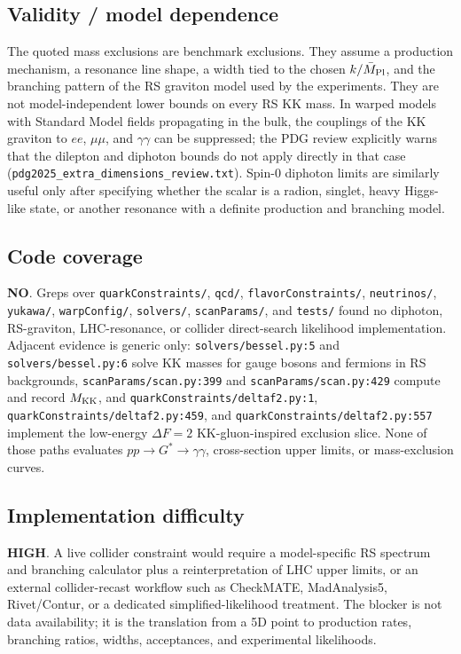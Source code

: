 \subsection*{Validity / model dependence}
The quoted mass exclusions are benchmark exclusions.  They assume a production
mechanism, a resonance line shape, a width tied to the chosen
\(k/\bar M_{\rm Pl}\), and the branching pattern of the RS graviton model used
by the experiments.  They are not model-independent lower bounds on every RS
KK mass.  In warped models with Standard Model fields propagating in the bulk,
the couplings of the KK graviton to \(ee\), \(\mu\mu\), and \(\gamma\gamma\)
can be suppressed; the PDG review explicitly warns that the dilepton and
diphoton bounds do not apply directly in that case
(\texttt{pdg2025\_extra\_dimensions\_review.txt}).  Spin-0 diphoton limits
are similarly useful only after specifying whether the scalar is a radion,
singlet, heavy Higgs-like state, or another resonance with a definite
production and branching model.

\subsection*{Code coverage}
\textbf{NO}.  Greps over \texttt{quarkConstraints/}, \texttt{qcd/},
\texttt{flavorConstraints/}, \texttt{neutrinos/}, \texttt{yukawa/},
\texttt{warpConfig/}, \texttt{solvers/}, \texttt{scanParams/}, and
\texttt{tests/} found no diphoton, RS-graviton, LHC-resonance, or collider
direct-search likelihood implementation.  Adjacent evidence is generic only:
\texttt{solvers/bessel.py:5} and \texttt{solvers/bessel.py:6} solve KK masses
for gauge bosons and fermions in RS backgrounds,
\texttt{scanParams/scan.py:399} and \texttt{scanParams/scan.py:429} compute
and record \(M_{\rm KK}\), and \texttt{quarkConstraints/deltaf2.py:1},
\texttt{quarkConstraints/deltaf2.py:459}, and
\texttt{quarkConstraints/deltaf2.py:557} implement the low-energy
\(\Delta F=2\) KK-gluon-inspired exclusion slice.  None of those
paths evaluates \(pp\to G^*\to\gamma\gamma\), cross-section upper limits, or
mass-exclusion curves.

\subsection*{Implementation difficulty}
\textbf{HIGH}.  A live collider constraint would require a model-specific
RS spectrum and branching calculator plus a reinterpretation of LHC upper
limits, or an external collider-recast workflow such as CheckMATE,
MadAnalysis5, Rivet/Contur, or a dedicated simplified-likelihood treatment.
The blocker is not data availability; it is the translation from a 5D point to
production rates, branching ratios, widths, acceptances, and experimental
likelihoods.


